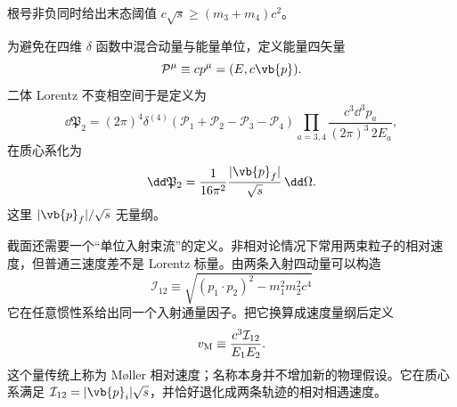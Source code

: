 根号非负同时给出末态阈值 \(c\sqrt s\ge(m_3+m_4)c^2\)。

为避免在四维 \(\delta\) 函数中混合动量与能量单位，定义能量四矢量
\begin{equation*}
 \mathcal P^\mu\equiv cp^\mu=(E,c\vb{p}).
\end{equation*}
二体 Lorentz 不变相空间于是定义为
\begin{equation}
 \dd\mathfrak P_2
 =(2\pi)^4\delta^{(4)}(\mathcal P_1+\mathcal P_2-\mathcal P_3-\mathcal P_4)
 \prod_{a=3,4}\frac{c^3\dd^3 p_a}{(2\pi)^3\,2E_a},
 \label{eq:phase2-si-start-r9}
\end{equation}
在质心系化为
\begin{equation}
 {
 \dd\mathfrak P_2
 =\frac1{16\pi^2}\frac{|\vb{p}_f|}{\sqrt s}\,\dd\Omega.}
 \label{eq:phase2-final-si-r9}
\end{equation}
这里 \(|\vb{p}_f|/\sqrt s\) 无量纲。

截面还需要一个“单位入射束流”的定义。非相对论情况下常用两束粒子的相对速度，但普通三速度差不是 Lorentz 标量。由两条入射四动量可以构造
\begin{equation}
 \mathcal I_{12}
 \equiv\sqrt{(p_1\!\cdot p_2)^2-m_1^2m_2^2c^4}
 \label{eq:invariant-flux-scalar-r9}
\end{equation}
它在任意惯性系给出同一个入射通量因子。把它换算成速度量纲后定义
\begin{equation}
 v_{\rm M}
 \equiv
 \frac{c^3\mathcal I_{12}}{E_1E_2}.
 \label{eq:moller-velocity-si-r9}
\end{equation}
这个量传统上称为 M\o ller 相对速度；名称本身并不增加新的物理假设。它在质心系满足 \(\mathcal I_{12}=|\vb{p}_i|\sqrt s\)，并恰好退化成两条轨迹的相对相遇速度。

